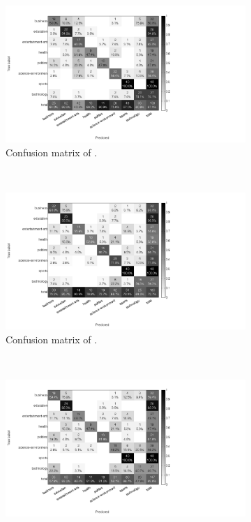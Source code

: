 \renewcommand{\figwidth}{0.43\textwidth}
\begin{figure}[H]
	\centering
	\begin{subfigure}[b]{\figwidth}
		\includegraphics[width=\textwidth,trim=0 0 350 0, clip]{img/Bernou_percentile_5_count.png}
		\caption{Confusion matrix of \bn.}
		\label{fig:confmat-be}
	\end{subfigure}
	~
	\begin{subfigure}[b]{\figwidth}
		\includegraphics[width=\textwidth,trim=0 0 350 0, clip]{img/Multinomial_percentile_5_count.png}
		\caption{Confusion matrix of \mn.}
		\label{fig:confmat-mn}
	\end{subfigure}
	\\
	\begin{subfigure}[b]{\figwidth}
		\includegraphics[width=\textwidth,trim=0 0 350 0, clip]{img/RandomForest_percentile_5_count.png}

\end{subfigure}
\end{figure}
